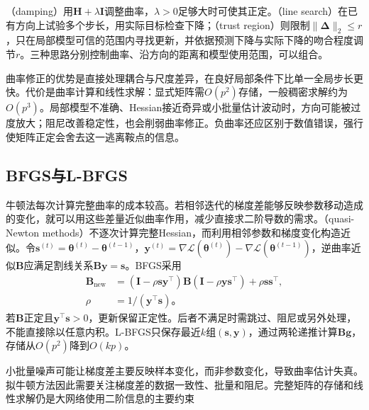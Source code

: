 （damping）用$\bm H+\lambda\bm I$调整曲率，$\lambda>0$足够大时可使其正定。（line search）在已有方向上试验多个步长，用实际目标检查下降；（trust region）则限制$\lVert\bm\Delta\rVert_2\leq r$，只在局部模型可信的范围内寻找更新，并依据预测下降与实际下降的吻合程度调节$r$。三种思路分别控制曲率、沿方向的距离和模型使用范围，可以组合。

曲率修正的优势是直接处理耦合与尺度差异，在良好局部条件下比单一全局步长更快。代价是曲率计算和线性求解：显式矩阵需$O(p^2)$存储，一般稠密求解约为$O(p^3)$。局部模型不准确、Hessian接近奇异或小批量估计波动时，方向可能被过度放大；阻尼改善稳定性，也会削弱曲率修正。负曲率还应区别于数值错误，强行使矩阵正定会舍去这一逃离鞍点的信息。

\subsection{BFGS与L-BFGS}
\label{sec:training-quasi-newton}

牛顿法每次计算完整曲率的成本较高。若相邻迭代的梯度差能够反映参数移动造成的变化，就可以用这些差量近似曲率作用，减少直接求二阶导数的需求。（quasi-Newton methods）不逐次计算完整Hessian，而利用相邻参数和梯度变化构造近似。令$\bm s^{(t)}=\bm\theta^{(t)}-\bm\theta^{(t-1)}$，$\bm y^{(t)}=\nabla\mathcal L(\bm\theta^{(t)})-\nabla\mathcal L(\bm\theta^{(t-1)})$，逆曲率近似$\bm B$应满足割线关系$\bm B\bm y=\bm s$。BFGS采用
\begin{equation}
  \begin{aligned}
  \bm B_{\mathrm{new}}
    &=(\bm I-\rho\bm s\bm y^{\top})\bm B
       (\bm I-\rho\bm y\bm s^{\top})+\rho\bm s\bm s^{\top},\\
  \rho&=1/(\bm y^{\top}\bm s)\text{。}
  \end{aligned}
  \label{eq:training-bfgs}
\end{equation}
若$\bm B$正定且$\bm y^{\top}\bm s>0$，更新保留正定性。后者不满足时需跳过、阻尼或另外处理，不能直接除以任意内积。L-BFGS只保存最近$k$组$(\bm s,\bm y)$，通过两轮递推计算$\bm B\bm g$，存储从$O(p^2)$降到$O(kp)$。

小批量噪声可能让梯度差主要反映样本变化，而非参数变化，导致曲率估计失真。拟牛顿方法因此需要关注梯度差的数据一致性、批量和阻尼。完整矩阵的存储和线性求解仍是大网络使用二阶信息的主要约束

